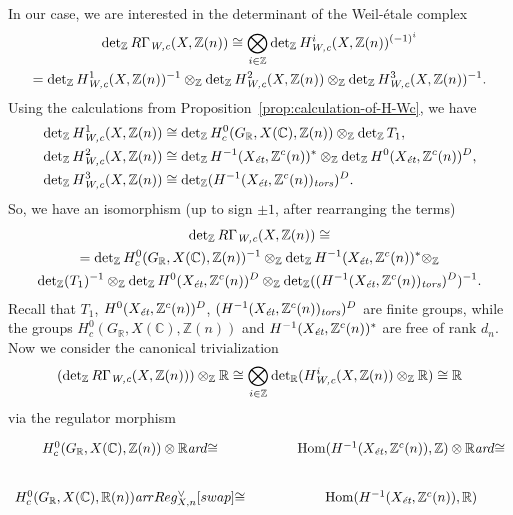 \documentclass[draft]{article}
\DeclareMathOperator{\Hom}{Hom}
\newcommand{\CC}{\mathbb{C}}
\newcommand{\RR}{\mathbb{R}}
\newcommand{\ZZ}{\mathbb{Z}}
\renewcommand{\det}{\operatorname{det}}
\newcommand{\ar}{\text{\it ar}}
\newcommand{\et}{\text{\it \'{e}t}}
\newcommand{\tors}{\text{\it tors}}
\newcommand{\Wc}{\text{\it W,c}}
\theoremstyle{myplain}
\theoremstyle{mydefinition}
\begin{document}
In our case, we are interested in the determinant of the Weil-\'{e}tale complex
\begin{multline*}
  \det_\ZZ R\Gamma_\Wc (X, \ZZ(n)) \cong
  \bigotimes_{i \in \ZZ} \det_\ZZ H^i_\Wc (X, \ZZ(n))^{(-1)^i} \\
  =
  \det_\ZZ H^1_\Wc (X, \ZZ(n))^{-1} \otimes_\ZZ
  \det_\ZZ H^2_\Wc (X, \ZZ(n)) \otimes_\ZZ
  \det_\ZZ H^3_\Wc (X, \ZZ(n))^{-1}.
\end{multline*}
Using the calculations from Proposition~\ref{prop:calculation-of-H-Wc}, we have
\begin{align*}
  \det_\ZZ H^1_\Wc (X, \ZZ(n)) & \cong \det_\ZZ H^0_c (G_\RR, X(\CC), \ZZ(n)) \otimes_\ZZ \det_\ZZ T_1, \\
  \det_\ZZ H^2_\Wc (X, \ZZ(n)) & \cong \det_\ZZ H^{-1} (X_\et, \ZZ^c(n))^* \otimes_\ZZ \det_\ZZ H^0 (X_\et, \ZZ^c(n))^D, \\
  \det_\ZZ H^3_\Wc (X, \ZZ(n)) & \cong \det_\ZZ (H^{-1} (X_\et, \ZZ^c(n))_\tors)^D.
\end{align*}
So, we have an isomorphism (up to sign $\pm 1$, after rearranging the terms)
\begin{multline*}
  \det_\ZZ R\Gamma_\Wc (X, \ZZ(n)) \cong \\
  =
  \det_\ZZ H^0_c (G_\RR, X(\CC), \ZZ(n))^{-1} \otimes_\ZZ
  \det_\ZZ H^{-1} (X_\et, \ZZ^c(n))^* \otimes_\ZZ \\
  \det_\ZZ (T_1)^{-1} \otimes_\ZZ  \det_\ZZ H^0 (X_\et, \ZZ^c(n))^D \otimes_\ZZ \det_\ZZ ((H^{-1} (X_\et, \ZZ^c(n))_\tors)^D)^{-1}.
\end{multline*}
Recall that $T_1$, $H^0 (X_\et, \ZZ^c(n))^D$,
$(H^{-1} (X_\et, \ZZ^c(n))_\tors)^D$ are finite groups, while the groups
$H^0_c (G_\RR, X(\CC), \ZZ(n))$ and $H^{-1} (X_\et, \ZZ^c(n))^*$ are free of
rank $d_n$. Now we consider the canonical trivialization
\[ (\det_\ZZ R\Gamma_\Wc (X, \ZZ(n))) \otimes_\ZZ \RR \cong
  \bigotimes_{i\in \ZZ} \det_\RR (H^i_\Wc (X, \ZZ(n))\otimes_\ZZ \RR)
  \cong \RR \]
via the regulator morphism
\[ \begin{tikzcd}[column sep=3em]
    H^0_c (G_\RR, X(\CC), \ZZ(n)) \otimes \RR\ar{d}{\cong} & \Hom (H^{-1} (X_\et, \ZZ^c (n)), \ZZ) \otimes \RR\ar{d}{\cong} \\
    H^0_c (G_\RR, X(\CC), \RR (n)) \ar{r}{Reg^\vee_{X,n}}[swap]{\cong} & \Hom (H^{-1} (X_\et, \ZZ^c (n)), \RR)
  \end{tikzcd} \]
\end{document}

